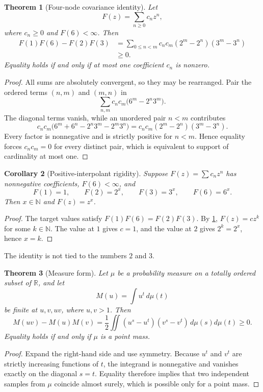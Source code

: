 \documentclass[11pt]{article}
\newtheorem{theorem}{Theorem}[section]
\newtheorem{corollary}[theorem]{Corollary}
\theoremstyle{definition}
\newcommand{\N}{\mathbb N}
\newcommand{\R}{\mathbb R}
\begin{document}
\begin{theorem}[Four-node covariance identity]\label{thm:covariance-identity}
Let
\[
 F(z)=\sum_{n\ge0}c_n z^n,
\]
where $c_n\ge0$ and $F(6)<\infty$.  Then
\begin{align}
 F(1)F(6)-F(2)F(3)
 &=\sum_{0\le n<m}c_nc_m(2^m-2^n)(3^m-3^n) \label{eq:covariance-sum}\\
 &\ge0.\nonumber
\end{align}
Equality holds if and only if at most one coefficient $c_n$ is nonzero.
\end{theorem}
\begin{proof}
All sums are absolutely convergent, so they may be rearranged.  Pair the ordered terms $(n,m)$ and $(m,n)$ in
\[
 \sum_{n,m}c_nc_m\bigl(6^m-2^n3^m\bigr).
\]
The diagonal terms vanish, while an unordered pair $n<m$ contributes
\[
 c_nc_m\bigl(6^m+6^n-2^n3^m-2^m3^n\bigr)
 =c_nc_m(2^m-2^n)(3^m-3^n).
\]
Every factor is nonnegative and is strictly positive for $n<m$.  Hence equality forces $c_nc_m=0$ for every distinct pair, which is equivalent to support of cardinality at most one.
\end{proof}

\begin{corollary}[Positive-interpolant rigidity]\label{cor:positive-rigidity}
Suppose $F(z)=\sum c_nz^n$ has nonnegative coefficients, $F(6)<\infty$, and
\[
 F(1)=1,\qquad F(2)=2^x,\qquad F(3)=3^x,\qquad F(6)=6^x.
\]
Then $x\in\N$ and $F(z)=z^x$.
\end{corollary}
\begin{proof}
The target values satisfy $F(1)F(6)=F(2)F(3)$.  By \cref{thm:covariance-identity}, $F(z)=cz^k$ for some $k\in\N$.  The value at $1$ gives $c=1$, and the value at $2$ gives $2^k=2^x$, hence $x=k$.
\end{proof}

The identity is not tied to the numbers $2$ and $3$.

\begin{theorem}[Measure form]\label{thm:measure-form}
Let $\mu$ be a probability measure on a totally ordered subset of $\R$, and let
\[
 M(u)=\int u^t\,d\mu(t)
\]
be finite at $u,v,uv$, where $u,v>1$.  Then
\begin{equation}\label{eq:measure-cov}
 M(uv)-M(u)M(v)
 =\frac12\iint (u^s-u^t)(v^s-v^t)\,d\mu(s)d\mu(t)\ge0.
\end{equation}
Equality holds if and only if $\mu$ is a point mass.
\end{theorem}
\begin{proof}
Expand the right-hand side and use symmetry.  Because $u^t$ and $v^t$ are strictly increasing functions of $t$, the integrand is nonnegative and vanishes exactly on the diagonal $s=t$.  Equality therefore implies that two independent samples from $\mu$ coincide almost surely, which is possible only for a point mass.
\end{proof}
\end{document}
